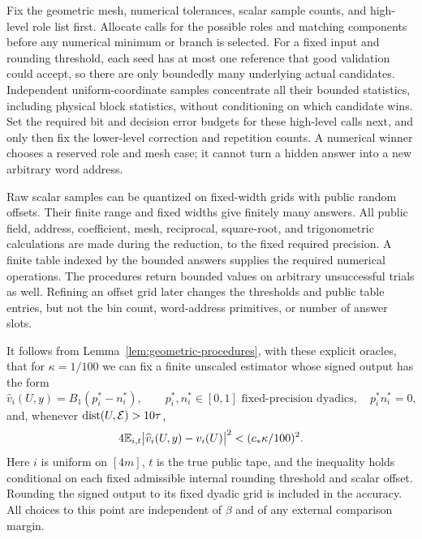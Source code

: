 Fix the geometric mesh, numerical tolerances, scalar sample counts, and
high-level role list first. Allocate calls for the possible roles and
matching components before any numerical minimum or branch is selected.
For a fixed input and rounding threshold, each seed has at most one
reference that good validation could accept, so there are only boundedly
many underlying actual candidates. Independent uniform-coordinate
samples concentrate all their bounded statistics, including physical
block statistics, without conditioning on which candidate wins. Set the
required bit and decision error budgets for these high-level calls next,
and only then fix the lower-level correction and repetition counts.
A numerical winner chooses a reserved role and mesh case; it cannot turn
a hidden answer into a new arbitrary word address.

Raw scalar samples can be quantized on fixed-width grids with public
random offsets. Their finite range and fixed widths give finitely many
answers. All public field, address, coefficient, mesh, reciprocal,
square-root, and trigonometric calculations are made during the
reduction, to the fixed required precision. A finite table indexed by
the bounded answers supplies the required numerical operations. The
procedures return bounded values on arbitrary unsuccessful trials as
well. Refining an offset grid later changes the thresholds and public
table entries, but not the bin count, word-address primitives, or number
of answer slots.

It follows from Lemma~\ref{lem:geometric-procedures}, with these explicit
oracles, that for $\kappa=1/100$ we can fix a finite unscaled estimator
whose signed output has the form
\begin{equation}\label{ig:ideal-estimator}
 \widehat v_i(U,y)=B_1(p_i^*-n_i^*),\qquad
 p_i^*,n_i^*\in[0,1]\text{ fixed-precision dyadics},\quad p_i^*n_i^*=0,
\end{equation}
and, whenever $\operatorname{dist}(U,\mathcal E)>10\tau$,
\begin{equation}\label{ig:ideal-error}
 4\mathbb{E}_{i,t}\bigl|\widehat v_i(U,y)-v_i(U)\bigr|^2
        <(c_*\kappa/100)^2.
\end{equation}
Here $i$ is uniform on $[4m]$, $t$ is the true public tape, and the
inequality holds conditional on each fixed admissible internal rounding
threshold and scalar offset. Rounding the signed output to its fixed
dyadic grid is included in the accuracy. All choices to this point are
independent of $\beta$ and of any external comparison margin.

